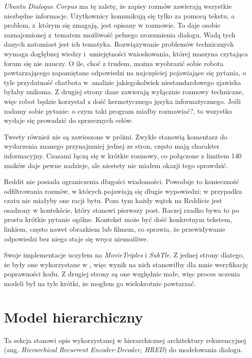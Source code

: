 \textit{Ubuntu Dialogue Corpus} ma tę zaletę, że zapisy rozmów zawierają wszystkie niezbędne informacje. Użytkownicy komunikują się tylko za pomocą tekstu, a problem, z~którym się zmagają, jest opisany w rozmowie. To daje osobie zaznajomionej z~tematem możliwość pełnego zrozumienia dialogu. Wadą tych danych natomiast jest ich tematyka. Rozwiązywanie problemów technicznych wymaga dogłębnej wiedzy i~umiejętności wnioskowania, której maszyna czytająca forum się nie nauczy. O ile, choć z trudem, można wyobrazić sobie robota powtarzającego zapamiętane odpowiedzi na najczęściej pojawiające się pytania, o tyle przydatność chatbota w~analizie jakiegokolwiek niestandardowego zjawiska byłaby znikoma. Z drugiej strony dane zawierają wyłącznie rozmowy techniczne, więc robot będzie korzystał z dość hermetycznego języka informatycznego. Jeśli zadamy sobie pytanie: o czym taki program miałby rozmawiać?, to wszystko wydaje się prowadzić do sprzecznych celów.

Tweety również nie są zawieszone w próżni. Zwykle stanowią komentarz do wydarzenia znanego przynajmniej jednej ze stron, często mają charakter informacyjny. Czasami łączą się w krótkie rozmowy, co połączone z limitem 140 znaków daje pewne nadzieje, ale niestety nie miałem okazji tego sprawdzić.

Reddit nie posiada ograniczenia długości wiadomości. Powoduje to konieczność odfiltrowania rozmów, w których pojawiają się długie wypowiedzi; w przypadku czatu nie miałyby one racji bytu. Poza tym każdy wątek na Reddicie jest osadzony w kontekście, który stanowi pierwszy post. Raczej rzadko bywa to po prostu krótkie pytanie ogólne. Kontekst może być dość konkretnym tekstem, linkiem, często nawet obrazkiem lub filmem, co sprawia, że przewidywanie odpowiedzi bez niego staje się wręcz niemożliwe.

Swoje implementacje uczyłem na \textit{MovieTriples} i \textit{SubTle}. Z jednej strony dlatego, że były one wykorzystane w \cite{serbanhred}, więc wynik na nich stanowiłby dla mnie weryfikację poprawności kodu. Z drugiej strony są one względnie małe, więc proces uczenia modeli był na tyle krótki, że mogłem go wielokrotnie powtarzać.


\section{Model hierarchiczny}
Ta sekcja stanowi opis wykorzystanej w \cite{serbanhred} hierarchicznej architektury rekurencyjnej (ang. \textit{Hierarchical Recurrent Encoder-Decoder, HRED}) \cite{hred} do modelowania dialogu.

